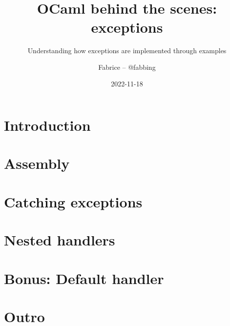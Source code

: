\documentclass[aspectratio=169,usenames,dvipsnames,8pt,compress]{beamer}
\title[OBTS: exceptions]{OCaml behind the scenes: exceptions}
\subtitle{Understanding how exceptions are implemented through examples}
\author{Fabrice -- @fabbing}
\institute{Tarides}
\date{2022-11-18}
\begin{document}
\newcommand{\funcname}[1]{%
\texttt{\textcolor{RoyalBlue}{#1}}%
}

\newcommand{\funcarg}[1]{%
\texttt{\textcolor{Periwinkle}{#1}}%
}

\newcommand{\localname}[1]{%
\texttt{\textcolor{Periwinkle}{#1}}%
}

\newcommand{\typename}[1]{%
\texttt{\textcolor{BrickRed}{#1}}%
}

\newcommand{\regname}[1]{%
  \texttt{\textcolor{Periwinkle}{$\langle$#1$\rangle$}}%
}





\newcommand\frameSubsection[2]{
\begin{frame}
\vfill
\centering
\begin{beamercolorbox}[sep=8pt,center,shadow=true,rounded=true]{title}
  \usebeamerfont{title}\insertsectionhead\par%
  \smallskip
  \usebeamerfont{subtitle}\insertsubsectionhead\par%
\end{beamercolorbox}
\ifthenelse{\equal{#1}{}}{}{
  \smallskip
  \begin{figure}
    \texttt{[image: \#1]}
    \ifthenelse{\equal{#2}{}}{}{
      \caption*{#2}
    }
  \end{figure}
}
\vfill
\end{frame}
}

\newcommand\frameSubsectionTakeaway{%
\frameSubsection{pictures/Trinity.png}{}%
}


\begin{frame}
  \titlepage
\end{frame}

\section*{Introduction}


\section{Assembly}


\section{Catching exceptions}


\section{Nested handlers}


\section{Bonus: Default handler}


\section*{Outro}



%

\end{document}
